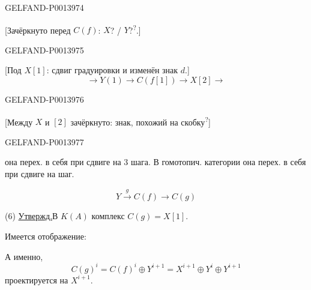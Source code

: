 \begin{GelfandAdjacentEvidence}{GELFAND-P001397}{4}

[Зачёркнуто перед \(C(f)\):
\(X\)? / \(Y\)?\textsuperscript{?}.]
\end{GelfandAdjacentEvidence}
\begin{GelfandAdjacentEvidence}{GELFAND-P001397}{5}

[Под \(X[1]\): сдвиг градуировки и изменён знак \(d\).]
\[
\longrightarrow Y(1)\longrightarrow C(f[1])\longrightarrow X[2]\longrightarrow
\]
\end{GelfandAdjacentEvidence}
\begin{GelfandAdjacentEvidence}{GELFAND-P001397}{6}

[Между \(X\) и \([2]\) зачёркнуто:
знак, похожий на скобку\textsuperscript{?}]
\end{GelfandAdjacentEvidence}
\begin{GelfandAdjacentEvidence}{GELFAND-P001397}{7}


она перех. в себя при сдвиге на 3 шага.
В гомотопич. категории она перех. в себя при сдвиге на шаг.

\begin{equation*}
Y\overset{g}{\longrightarrow}C(f)\longrightarrow C(g)
\tag{5}
\end{equation*}

(6) \uline{Утвержд.}\quad В \(K(A)\) комплекс \(C(g)=X[1]\).

Имеется отображение:
\end{GelfandAdjacentEvidence}


А именно,
\[
C(g)^i=C(f)^i\oplus Y^{i+1}=X^{i+1}\oplus Y^i\oplus Y^{i+1}
\]
проектируется на \(X^{i+1}\).


